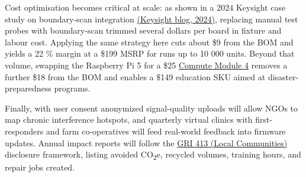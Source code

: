 \documentclass{article}
\begin{document}
Cost optimisation becomes critical at scale: as shown in a 2024 Keysight case study on boundary-scan integration \href{https://www.keysight.com/blogs/en/tech/bench/2024/08/13/enhancingboardtestcoveragewithboundary-scan}{(Keysight blog, 2024)}, replacing manual test probes with boundary-scan trimmed several dollars per board in fixture and labour cost.  Applying the same strategy here cuts about \$9 from the BOM and yields a 22 \% margin at a \$199 MSRP for runs up to 10 000 units.  Beyond that volume, swapping the Raspberry Pi 5 for a \$25 \href{https://www.raspberrypi.com/products/compute-module-4/}{Compute Module 4} removes a further \$18 from the BOM and enables a \$149 education SKU aimed at disaster-preparedness programs.

Finally, with user consent anonymized signal-quality uploads will allow NGOs to map chronic interference hotspots, and quarterly virtual clinics with first-responders and farm co-operatives will feed real-world feedback into firmware updates.  Annual impact reports will follow the 
\href{https://www.globalreporting.org/publications/documents/english/gri-413-local-communities-2016/}{GRI 413 (Local Communities)} disclosure framework, listing avoided CO\textsubscript{2}e, recycled volumes, training hours, and repair jobs created.


\end{document}
